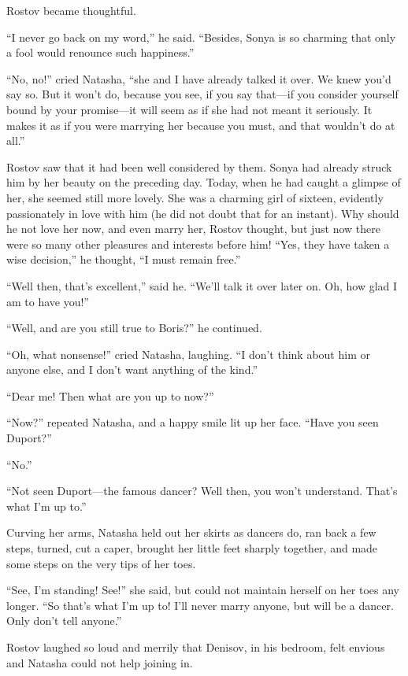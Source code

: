 Rostov became thoughtful.

``I never go back on my word,'' he said. ``Besides, Sonya is so
charming that only a fool would renounce such happiness.''

``No, no!'' cried Natasha, ``she and I have already talked it
over. We knew you'd say so. But it won't do, because you see, if
you say that---if you consider yourself bound by your
promise---it will seem as if she had not meant it seriously. It
makes it as if you were marrying her because you must, and that
wouldn't do at all.''

Rostov saw that it had been well considered by them. Sonya had
already struck him by her beauty on the preceding day. Today,
when he had caught a glimpse of her, she seemed still more
lovely. She was a charming girl of sixteen, evidently
passionately in love with him (he did not doubt that for an
instant). Why should he not love her now, and even marry her,
Rostov thought, but just now there were so many other pleasures
and interests before him! ``Yes, they have taken a wise
decision,'' he thought, ``I must remain free.''

``Well then, that's excellent,'' said he. ``We'll talk it over
later on.  Oh, how glad I am to have you!''

``Well, and are you still true to Boris?'' he continued.

``Oh, what nonsense!'' cried Natasha, laughing. ``I don't think
about him or anyone else, and I don't want anything of the
kind.''

``Dear me! Then what are you up to now?''

``Now?'' repeated Natasha, and a happy smile lit up her
face. ``Have you seen Duport?''

``No.''

``Not seen Duport---the famous dancer? Well then, you won't
understand.  That's what I'm up to.''

Curving her arms, Natasha held out her skirts as dancers do, ran
back a few steps, turned, cut a caper, brought her little feet
sharply together, and made some steps on the very tips of her
toes.

``See, I'm standing! See!'' she said, but could not maintain
herself on her toes any longer. ``So that's what I'm up to! I'll
never marry anyone, but will be a dancer. Only don't tell
anyone.''

Rostov laughed so loud and merrily that Denisov, in his bedroom,
felt envious and Natasha could not help joining in.

